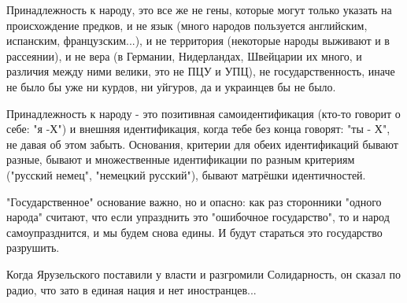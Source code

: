 \begin{itemize}
Принадлежность к народу, это все же не гены, которые могут только указать на
происхождение предков, и не язык (много народов пользуется английским,
испанским, французским...), и не территория (некоторые народы выживают и в
рассеянии), и не вера (в Германии, Нидерландах, Швейцарии их много, и различия
между ними велики, это не ПЦУ и УПЦ), не государственность, иначе не было бы
уже ни курдов, ни уйгуров, да и украинцев бы не было. 

Принадлежность к народу - это позитивная самоидентификация (кто-то говорит о
себе: "я -Х") и внешняя идентификация, когда тебе без конца говорят: "ты - Х",
не давая об этом забыть.  Основания, критерии для обеих идентификаций бывают
разные, бывают и множественные идентификации по разным критериям ("русский
немец", "немецкий русский"), бывают матрёшки идентичностей. 

"Государственное" основание важно, но и опасно: как раз сторонники "одного
народа" считают, что если упразднить это "ошибочное государство", то и народ
самоупразднится, и мы будем снова едины. И будут стараться это государство
разрушить.

 

Когда Ярузельского поставили у власти и разгромили Солидарность, он сказал по
радио, что зато в единая нация и нет иностранцев...

\end{itemize}

